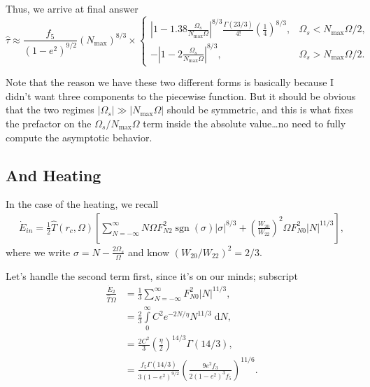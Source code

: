 \documentclass[11pt,
        usenames, %
        dvipsnames %
    ]{article}
\newcommand*{\abs}[1]{\left|#1\right|}
\newcommand*{\p}[1]{\left(#1\right)}
\newcommand*{\s}[1]{\left[#1\right]}
\DeclareMathOperator{\sgn}{sgn}
\begin{document}
Thus, we arrive at final answer
\begin{equation}
    \hat{\tau} \approx
        \frac{f_5}{\p{1 - e^2}^{9/2}}\p{N_{\max}}^{8/3} \times
    \begin{cases}
        \abs{1 - 1.38\frac{\Omega_s}{N_{\max}\Omega}}^{8/3}
            \frac{\Gamma(23/3)}{4!}\p{\frac{1}{4}}^{8/3},
            & \Omega_s < N_{\max}\Omega / 2,\\[5pt]
        -\abs{1 - 2\frac{\Omega_s}{N_{\max}\Omega}}^{8/3},
            & \Omega_s > N_{\max}\Omega / 2.
    \end{cases}\label{eq:traveling_torque}
\end{equation}

Note that the reason we have these two different forms is basically because I
didn't want three components to the piecewise function. But it should be obvious
that the two regimes $\abs{\Omega_s} \gg \abs{N_{\max}\Omega}$ should be
symmetric, and this is what fixes the prefactor on the $\Omega_s /
N_{\max}\Omega$ term inside the absolute value\dots no need to fully compute the
asymptotic behavior.

\subsection{And Heating}

In the case of the heating, we recall
\begin{align}
     \dot{E}_{in} = \frac{1}{2}\hat{T}\p{r_c, \Omega}\s{
         \sum\limits_{N = -\infty}^\infty
            N\Omega F_{N2}^2 \sgn \p{\sigma} \abs{\sigma}^{8/3}
            + \p{\frac{W_{20}}{W_{22}}}^2\Omega F_{N0}^2 \abs{N}^{11/3}},
\end{align}
where we write $\sigma = N - \frac{2\Omega_s}{\Omega}$ and know $\p{W_{20} /
W_{22}}^2 = 2/3$.

Let's handle the second term first, since it's on our minds; subscript
\begin{align}
    \frac{\dot{E}_2}{\hat{T}\Omega}
        &= \frac{1}{3} \sum\limits_{N = -\infty}^\infty
            F_{N0}^2\abs{N}^{11/3},\\
        &= \frac{2}{3}\int\limits_0^\infty C^2e^{-2N/\eta}N^{11/3}
            \;\mathrm{d}N,\\
        &= \frac{2C^2}{3}\p{\frac{\eta}{2}}^{14/3}\Gamma(14/3),\\
        &= \frac{f_5\Gamma(14/3)}{3\p{1 - e^2}^{9/2}}
            \p{\frac{9e^2f_3}{2\p{1 - e^2}^3 f_5}}^{11/6}.
\end{align}
\end{document}
